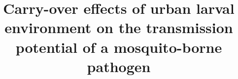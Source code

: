 \documentclass[doublespacing, linenumbers]{bmcart}
\begin{document}
\begin{frontmatter}

\begin{fmbox}


\title{Carry-over effects of urban larval environment on the transmission potential of a mosquito-borne pathogen}


\author[
   addressref={aff1,aff2},
   corref={aff1},
   email={mvevans@uga.edu}
]{ }

\author[
   addressref={aff3},=
]{ }

\author[
   addressref={aff1, aff2},=
]{ }

\author[
   addressref={aff3, aff4},=
]{ }

\author[
   addressref={aff1,aff2},
   email={jdrake@uga.edu}
]{ }

\author[
   addressref={aff1,aff2, aff3, aff5, aff6, aff7},
   email={cmurdock@uga.edu}
]{ }


\address[id=aff1]{%
  , %
  ,                              %
}


\end{fmbox}
\end{frontmatter}
\end{document}
